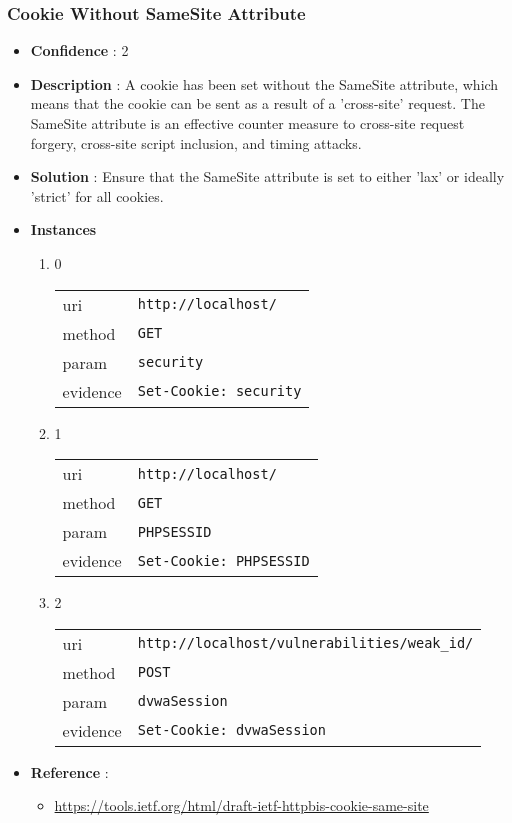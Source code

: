 \documentclass[10pt]{article}
\begin{document}
\subsubsection{Cookie Without SameSite Attribute}
\begin{itemize}
\item[] \textbf{Confidence} : 2
\item[] \textbf{Description} : A cookie has been set without the SameSite attribute, which means that the cookie can be sent as a result of a 'cross-site' request. The SameSite attribute is an effective counter measure to cross-site request forgery, cross-site script inclusion, and timing attacks.
\item[] \textbf{Solution} :  Ensure that the SameSite attribute is set to either 'lax' or ideally 'strict' for all cookies.
\item[] \textbf{Instances}
\begin{enumerate}
\item[] 0
\begin{tabular}{| l | p{12cm}}
uri & \texttt{http://localhost/} \\
method & \texttt{GET} \\
param & \texttt{security} \\
evidence & \texttt{Set-Cookie: security} \\
\end{tabular}
\item[] 1
\begin{tabular}{| l | p{12cm}}
uri & \texttt{http://localhost/} \\
method & \texttt{GET} \\
param & \texttt{PHPSESSID} \\
evidence & \texttt{Set-Cookie: PHPSESSID} \\
\end{tabular}
\item[] 2
\begin{tabular}{| l | p{12cm}}
uri & \texttt{http://localhost/vulnerabilities/weak\_id/} \\
method & \texttt{POST} \\
param & \texttt{dvwaSession} \\
evidence & \texttt{Set-Cookie: dvwaSession} \\
\end{tabular}
\end{enumerate}
\item[] \textbf{Reference} : 
\begin{itemize}
\item \url{https://tools.ietf.org/html/draft-ietf-httpbis-cookie-same-site}
\end{itemize}
\end{itemize}
\end{document}
